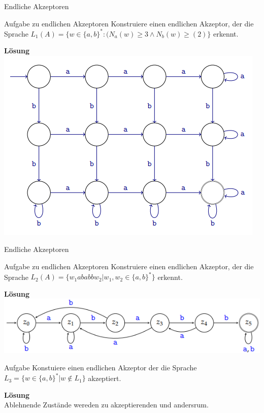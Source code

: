 \begin{frame}{Endliche Akzeptoren}
	\begin{taskblock}{Aufgabe zu endlichen Akzeptoren}
		Konstruiere einen endlichen Akzeptor, der die Sprache $L_1(A) = \{w \in \{a,b\}^* : (N_a(w) \geq 3 \land N_b(w) \geq(2)\}$ erkennt.
	\end{taskblock}
	
	\pause
	\textbf{Lösung}\\
	\includegraphics[scale=0.6]{images/AufgAkzeptor2.png}
\end{frame}
		
		

\begin{frame}{Endliche Akzeptoren}
	\begin{taskblock}{Aufgabe zu endlichen Akzeptoren}
		Konstruiere einen endlichen Akzeptor, der die Sprache $L_2(A) = \{w_1 ababb w_2| w_1, w_2 \in \{a,b\}^*\}$ erkennt.
	\end{taskblock}
	
	\pause
	\textbf{Lösung}\\
	\includegraphics[scale=0.7]{images/AufgAkzeptor.png}\\
	\pause
	\begin{taskblock}{Aufgabe}
		Konstuiere einen endlichen Akzeptor der die Sprache $L_3 =\{w \in \{a,b\}^*| w \not \in L_1\}$ akzeptiert.
	\end{taskblock}
	\pause
	\textbf{Lösung} \\Ablehnende Zustände wereden zu akzeptierenden und andersrum.
\end{frame}		 

